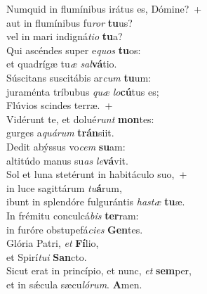 \evenverse Numquid in flumínibus irátus es, Dómine?~+\\\evenverse  aut in flumínibus fu\textit{ror} \textbf{tu}us?~\*\\
\evenverse vel in mari indigná\textit{ti}\textit{o} \textbf{tu}a?\\
\oddverse Qui ascéndes super e\textit{quos} \textbf{tu}os:~\*\\
\oddverse et quadrígæ tu\textit{æ} \textit{sal}\textbf{vá}tio.\\
\evenverse Súscitans suscitábis ar\textit{cum} \textbf{tu}um:~\*\\
\evenverse juraménta tríbubus \textit{quæ} \textit{lo}\textbf{cú}tus es;\\
\oddverse Flúvios scindes terræ.~+\\
\oddverse  Vidérunt te, et dolué\textit{runt} \textbf{mon}tes:~\*\\
\oddverse gurges a\textit{quá}\textit{rum} \textbf{trán}siit.\\
\evenverse Dedit abýssus vo\textit{cem} \textbf{su}am:~\*\\
\evenverse altitúdo manus su\textit{as} \textit{le}\textbf{vá}vit.\\
\oddverse Sol et luna stetérunt in habitáculo suo,~+\\
\oddverse  in luce sagittárum \textit{tu}\textbf{á}rum,~\*\\
\oddverse ibunt in splendóre fulgurántis \textit{ha}\textit{stæ} \textbf{tu}æ.\\
\evenverse In frémitu conculcá\textit{bis} \textbf{ter}ram:~\*\\
\evenverse in furóre obstupefá\textit{ci}\textit{es} \textbf{Gen}tes.\\
\oddverse Glória Patri, \textit{et} \textbf{Fí}lio,~\*\\
\oddverse et Spirí\textit{tu}\textit{i} \textbf{San}cto.\\
\evenverse Sicut erat in princípio, et nunc, \textit{et} \textbf{sem}per,~\*\\
\evenverse et in sǽcula sæcu\textit{ló}\textit{rum}. \textbf{A}men.\\
